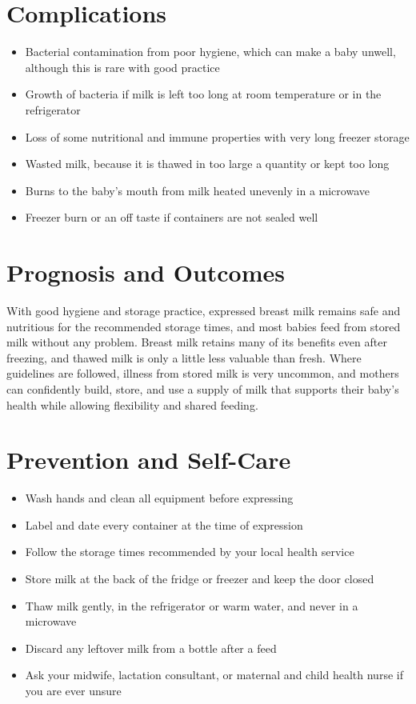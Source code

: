 \section*{Complications}
\begin{itemize}
    \item Bacterial contamination from poor hygiene, which can make a baby unwell, although this is rare with good practice
    \item Growth of bacteria if milk is left too long at room temperature or in the refrigerator
    \item Loss of some nutritional and immune properties with very long freezer storage
    \item Wasted milk, because it is thawed in too large a quantity or kept too long
    \item Burns to the baby's mouth from milk heated unevenly in a microwave
    \item Freezer burn or an off taste if containers are not sealed well
\end{itemize}

\section*{Prognosis and Outcomes}
With good hygiene and storage practice, expressed breast milk remains safe and nutritious for the recommended storage times, and most babies feed from stored milk without any problem. Breast milk retains many of its benefits even after freezing, and thawed milk is only a little less valuable than fresh. Where guidelines are followed, illness from stored milk is very uncommon, and mothers can confidently build, store, and use a supply of milk that supports their baby's health while allowing flexibility and shared feeding.

\section*{Prevention and Self-Care}
\begin{itemize}
    \item Wash hands and clean all equipment before expressing
    \item Label and date every container at the time of expression
    \item Follow the storage times recommended by your local health service
    \item Store milk at the back of the fridge or freezer and keep the door closed
    \item Thaw milk gently, in the refrigerator or warm water, and never in a microwave
    \item Discard any leftover milk from a bottle after a feed
    \item Ask your midwife, lactation consultant, or maternal and child health nurse if you are ever unsure
\end{itemize}

